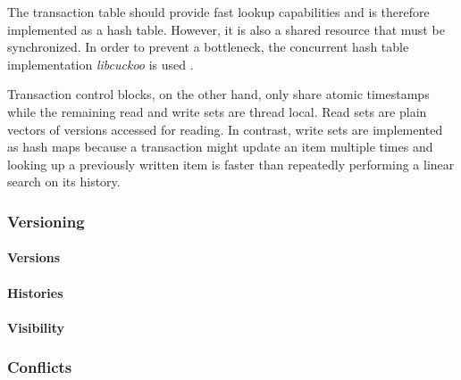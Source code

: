 The transaction table should provide fast lookup capabilities and is therefore
implemented as a hash table. However, it is also a shared resource that must be
synchronized. In order to prevent a bottleneck, the concurrent hash table
implementation \emph{libcuckoo} is used \cite{fan2013memc3, li2014algorithmic,
libcuckoo2018home}.

Transaction control blocks, on the other hand, only share atomic timestamps
while the remaining read and write sets are thread local. Read sets are plain
vectors of versions accessed for reading. In contrast, write sets are
implemented as hash maps because a transaction might update an item multiple
times and looking up a previously written item is faster than repeatedly
performing a linear search on its history.

\subsubsection{Versioning}
\paragraph{Versions}
\paragraph{Histories}
\paragraph{Visibility}

\subsubsection{Conflicts}
